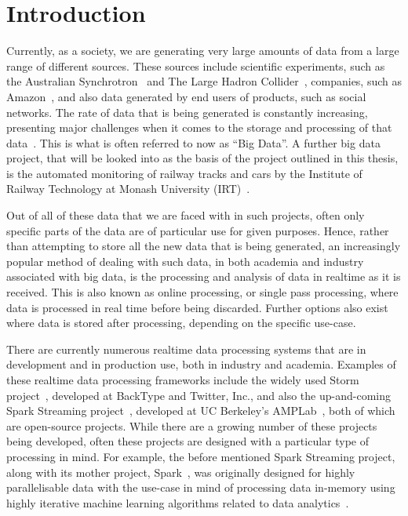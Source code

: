 \chapter{Introduction}
\label{sec:intro}

Currently, as a society, we are generating very large amounts of data from a large range of different sources. These
sources include scientific experiments, such as the Australian Synchrotron~\cite{web:synchrotron} and The Large Hadron
Collider~\cite{web:LHC}, companies, such as Amazon~\cite{web:Amazon}, and also data generated by end users of products,
such as social networks. The rate of data that is being generated is constantly increasing, presenting major challenges
when it comes to the storage and processing of that data~\cite{bohlouli_towards_2013}. This is what is often referred to
now as ``Big Data''. A further big data project, that will be looked into as the basis of the project outlined in this
thesis, is the automated monitoring of railway tracks and cars by the Institute of Railway Technology at Monash University
(IRT)~\cite{web:monash_irt}.

Out of all of these data that we are faced with in such projects, often only specific parts of the data are of particular use for given
purposes. Hence, rather than attempting to store all the new data that is being generated, an increasingly popular method of
dealing with such data, in both academia and industry associated with big data, is the processing and analysis of
data in realtime as it is received. This is also known as online processing, or single pass processing, where data is
processed in real time before being discarded. Further options also exist where data is stored after processing, depending
on the specific use-case.

There are currently numerous realtime data processing systems that are in development and in production use, both in
industry and academia. Examples of these realtime data processing frameworks include the widely used Storm
project~\cite{web:Storm}, developed at BackType and Twitter, Inc., and also the up-and-coming Spark Streaming
project~\cite{web:SparkStreaming}, developed at UC Berkeley's AMPLab~\cite{web:UCBerkelyAMCLab}, both of which are
open-source projects. While there are a growing number of these projects being developed, often these projects are designed
with a particular type of processing in mind. For example, the before
mentioned Spark Streaming project, along with its mother project, Spark~\cite{web:Spark}, was originally designed for highly
parallelisable data with the use-case in mind of processing data in-memory using highly iterative machine learning
algorithms related to data analytics~\cite{liu_survey_2014}.

